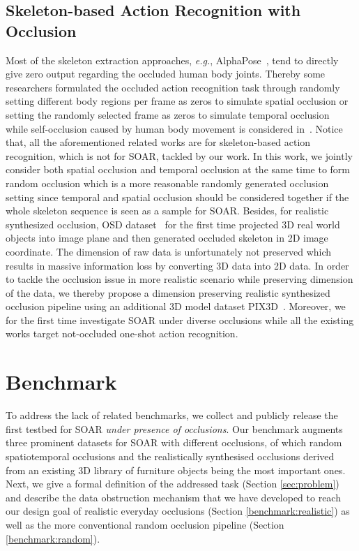 \documentclass[lettersize,journal]{IEEEtran}
\begin{document}
\subsection{Skeleton-based Action Recognition with Occlusion}
Most of the skeleton extraction approaches, \textit{e.g.}, AlphaPose~\cite{fang2017rmpe,li2018crowdpose,xiu2018poseflow}, tend to directly give zero output regarding the occluded human body joints.
Thereby some researchers formulated the occluded action recognition task through randomly setting different body regions per frame as zeros to simulate spatial occlusion or setting the randomly selected frame as zeros to simulate temporal occlusion~\cite{song2019richly,song2020richly,li2021partially,ding2020generalized,9732169,8853267} while self-occlusion caused by human body movement is considered in~\cite{8239649}. Notice that, all the aforementioned related works are for skeleton-based action recognition, which is not for SOAR, tackled by our work.
In this work, we jointly consider both spatial occlusion and temporal occlusion at the same time to form random occlusion which is a more reasonable randomly generated occlusion setting since temporal and spatial occlusion should be considered together if the whole skeleton sequence is seen as a sample for SOAR.
Besides, for realistic synthesized occlusion, OSD dataset~\cite{wu2020osd} for the first time projected 3D real world objects into image plane and then generated occluded skeleton in 2D image coordinate. The dimension of raw data is unfortunately not preserved which results in massive information loss by converting 3D data into 2D data.
In order to tackle the occlusion issue in more realistic scenario while preserving dimension of the data, we thereby propose a dimension preserving realistic synthesized occlusion pipeline using an additional 3D model dataset PIX3D~\cite{sun2018pix3d}. Moreover, we for the first time investigate SOAR under diverse occlusions while all the existing works target not-occluded one-shot action recognition. \section{Benchmark}
\label{sec:benchmark}
To address the lack of related benchmarks, we collect and publicly release the first testbed for SOAR \textit{under presence of occlusions}. 
Our benchmark augments three prominent datasets for SOAR with different occlusions, of which random spatiotemporal occlusions and the realistically synthesised occlusions derived from an existing 3D library of furniture objects being the most important ones.
Next, we give a formal definition of the addressed task (Section \ref{sec:problem}) and 
describe the data obstruction mechanism that we have developed to reach our design goal of realistic everyday occlusions (Section \ref{benchmark:realistic}) as well as the more conventional random occlusion pipeline (Section \ref{benchmark:random}).
\end{document}

